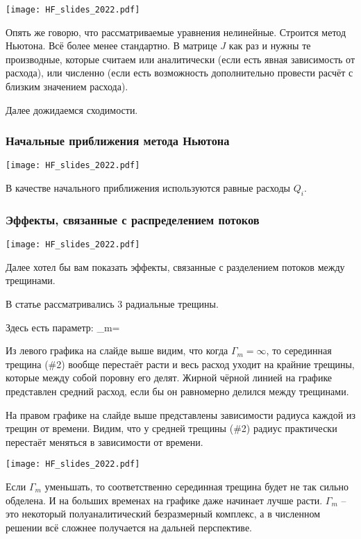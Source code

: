 \documentclass[main.tex]{subfiles}
\begin{document}
\texttt{[image: HF\_slides\_2022.pdf]}

Опять же говорю, что рассматриваемые уравнения нелинейные.
Строится метод Ньютона.
Всё более менее стандартно.
В матрице $J$ как раз и нужны те производные, которые считаем или аналитически (если есть явная зависимость от расхода), или численно (если есть возможность дополнительно провести расчёт с близким значением расхода).

Далее дожидаемся сходимости.

\subsubsection{Начальные приближения метода Ньютона}

\texttt{[image: HF\_slides\_2022.pdf]}

В качестве начального приближения используются равные расходы $Q_i$.

\subsubsection{Эффекты, связанные с распределением потоков}

\texttt{[image: HF\_slides\_2022.pdf]}

Далее хотел бы вам показать эффекты, связанные с разделением потоков между трещинами.

В статье рассматривались 3 радиальные трещины.

Здесь есть параметр:
\beq
\Gamma_m=
\eeq

Из левого графика на слайде выше видим, что когда $\Gamma_m=\infty$, то серединная трещина (\#2) вообще перестаёт расти и весь расход уходит на крайние трещины, которые между собой поровну его делят.
Жирной чёрной линией на графике представлен средний расход, если бы он равномерно делился между трещинами.

На правом графике на слайде выше представлены зависимости радиуса каждой из трещин от времени.
Видим, что у средней трещины (\#2) радиус практически перестаёт меняться в зависимости от времени.

\texttt{[image: HF\_slides\_2022.pdf]}

Если $\Gamma_m$ уменьшать, то соответственно серединная трещина будет не так сильно обделена.
И на больших временах на графике даже начинает лучше расти.
$\Gamma_m$ -- это некоторый полуаналитический безразмерный комплекс, а в численном решении всё сложнее получается на дальней перспективе.
\end{document}
